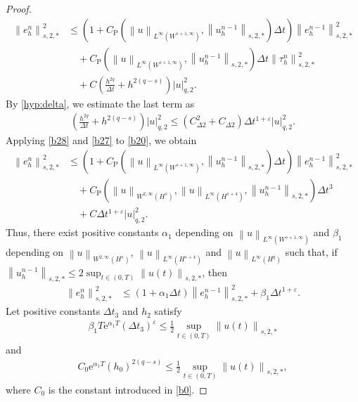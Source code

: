 \documentclass[10pt,a4paper,tbtags,leqno]{amsart}
\theoremstyle{definition}
\numberwithin{equation}{section}
\def\norm#1#2{\left\|#2\right\|_{#1}}
\def\snorm#1#2{\left|#2\right|_{#1}}
\begin{document}
\begin{proof}
\begin{align}
    \norm{s, 2, \ast}{e_h^n}^2 & \leq \left(1 + C_{\mathrm{P}} (\norm{L^{\infty} (W^{s + 1, \infty})}{u}, \norm{s, 2, \ast}{u_h^{n - 1}} ) \Delta t \right) \norm{s, 2, \ast}{e_h^{n - 1}}^2 \\ & \quad + C_{\mathrm{P}} (\norm{L^{\infty} (W^{s + 1, \infty})}{u}, \norm{s, 2, \ast}{u_h^{n - 1}}) \Delta t \norm{s, 2, \ast}{\tau_h^{n}}^2 \\ & \quad + C\left(\frac{h^{2q}}{\Delta t} + h^{2 (q - s)}\right)\snorm{q, 2}{u}^2. \label{b20} 
  \end{align} 
  By \eqref{hyp:delta}, we estimate the last term as 
  \begin{align} 
    \left(\frac{h^{2q}}{\Delta t} + h^{2 (q - s)}\right)\snorm{q, 2}{u}^2 \leq (C_{\Delta 2}^2 + C_{\Delta 2}) \Delta t^{1 + \varepsilon}\snorm{q, 2}{u}^2. \label{b27} 
  \end{align} 
  Applying \eqref{b28} and \eqref{b27} to \eqref{b20}, we obtain 
  \begin{align} 
    \norm{s, 2, \ast}{e_h^n}^2 & \leq \left(1 + C_{\mathrm{P}} (\norm{L^{\infty} (W^{s + 1, \infty})}{u}, \norm{s, 2, \ast}{u_h^{n - 1}} ) \Delta t \right) \norm{s, 2, \ast}{e_h^{n - 1}}^2 \\ 
    & \quad + C_{\mathrm{P}} (\norm{W^{2, \infty}(H^{s})}{u}, \norm{L^{\infty}(H^{s+4})}{u}, \norm{s, 2, \ast}{u_h^{n - 1}}) \Delta t^3 \\ & \quad + C \Delta t^{1 + \varepsilon}\snorm{q, 2}{u}^2. \label{b18}
  \end{align} 
  Thus, there exist positive constants $ \alpha_1 $ depending on $ \norm{L^\infty(W^{s+1, \infty})}{u} $ and $ \beta_1 $ depending on $ \norm{W^{2, \infty}(H^s)}{u} $, $ \norm{L^{\infty}(H^{s + 4})}{u} $ and $ \norm{L^{\infty}(H^q)}{u} $ such that, if $ \norm{s, 2, \ast}{u_h^{n - 1}} \leq 2 \sup_{t\in (0, T)} \norm{s, 2, \ast}{u (t)} $, then 
  \begin{align} 
    \norm{s, 2, \ast}{e_h^n}^2 & \leq \left(1 + \alpha_1 \Delta t \right) \norm{s, 2, \ast}{e_h^{n - 1}}^2 + \beta_1 \Delta t^{1 + \varepsilon}. \label{b15} 
  \end{align} 
  Let positive constants $ \Delta t_3 $ and $ h_2 $ satisfy 
  \begin{align}
    \beta_1 T \mathrm{e}^{\alpha_1 T} (\Delta t_3)^\varepsilon \leq \frac{1}{2} \sup_{t\in (0, T)} \norm{s, 2, \ast}{u (t)} \label{b16} 
  \end{align} 
  and 
  \begin{align} 
    C_0 \mathrm{e}^{\alpha_1 T} (h_0)^{2(q - s)} \leq \frac{1}{2} \sup_{t\in (0, T)} \norm{s, 2, \ast}{u (t)}, \label{b17} 
  \end{align} 
  where $ C_0 $ is the constant introduced in \eqref{b0}. 
  

\end{proof}
\end{document}
